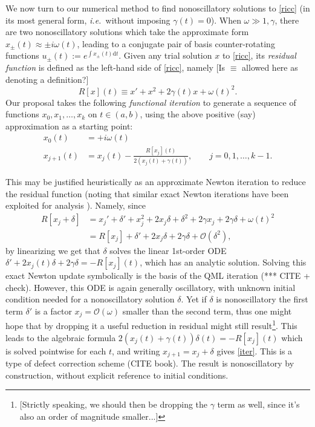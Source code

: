 \documentclass[10pt]{article}
\newcommand{\be}{\begin{equation}}
\newcommand{\ee}{\end{equation}}
\newcommand{\ie}{{\it i.e.\ }}
\renewcommand{\d}{\mathrm{d}} %
\newcommand{\bigO}{{\mathcal O}}
\newcommand{\om}{\omega}
\newcommand{\g}{\gamma}
\newcommand{\Fruzsi}[1]{{\color{blue}#1}}
\begin{document}
\Fruzsi{We now turn to our numerical method to find nonoscillatory
solutions to \cref{ricc} (in its most general form, \ie without imposing $\g(t) = 0$).
When $\om\gg 1, \g$, there are two nonoscillatory solutions
which take the approximate form
$x_{\pm}(t) \approx \pm i\om(t)$, leading to a conjugate pair of basis
counter-rotating functions $u_{\pm}(t) := e^{\int x_\pm(t) \d t}$.
Given any trial solution $x$ to \cref{ricc}, its \textit{residual
  function} is defined as the left-hand side of \cref{ricc}, namely
\Fruzsi{[Is $\equiv$ allowed here as denoting a definition?]
\be
\label{R}
R[x](t) \equiv x' + x^2 + 2\g(t)x + \om(t)^2.
\ee
}
Our proposal takes the following \textit{functional iteration}
to generate a sequence of functions $x_0, x_1, \dots, x_k$
on $t\in(a,b)$,
using the above positive (say) approximation as a starting point:
\begin{align}
x_0(t) &= +i\om(t)
\label{init}
\\
    x_{j+1}(t) &= x_j(t) - \frac{R[x_j](t)}{2 \left( x_j(t) + \g(t) \right)}, \qquad j=0,1,\dots,k-1.
\label{iter}
\end{align}

This may be justified heuristically as an approximate Newton
iteration to reduce the residual function
(noting that similar exact Newton iterations have been
exploited for analysis \cite{Heit15}).
Namely, since
\begin{align}
    R[x_j + \delta] &= x_j' + \delta' + x_j^2 + 2 x_j \delta + \delta^2 
    + 2\g x_j + 2\g\delta + \om(t)^2 \nonumber \\
    &= R[x_j] + \delta' + 2x_j\delta + 2\g\delta + \bigO(\delta^2), \nonumber
\end{align}
by linearizing we get that $\delta$ solves the linear 1st-order ODE
$\delta' + 2x_j(t) \delta + 2\g \delta  = -R[x_j](t)$,
which has an analytic solution.
Solving this exact Newton update symbolically is the basis of the QML iteration
(*** CITE + check).
However, this ODE is again generally oscillatory,
with unknown initial condition needed for a nonoscillatory solution $\delta$.
Yet if $\delta$ is nonoscillatory the first term $\delta'$ is
a factor $x_j = \bigO(\om)$ smaller than the second term, thus
one might hope that by dropping it a useful reduction in residual might
still result\footnote{\Fruzsi{[Strictly speaking, we should then be dropping the $\g$ term as well, since it's also an order of magnitude smaller...]}}. 
This leads to the algebraic formula $2\left(x_j(t) + \g(t)\right) \delta(t) = -R[x_j](t)$
which is solved pointwise for each $t$, and
writing $x_{j+1} = x_j + \delta$ gives \cref{iter}.
This is a type of defect correction scheme (CITE book).
The result is nonoscillatory by construction, without explicit reference
to initial conditions.

}
\end{document}
